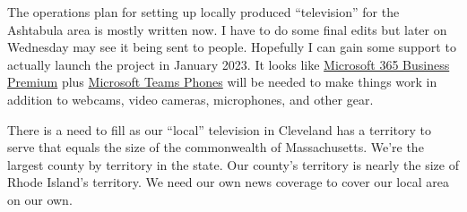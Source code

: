 The operations plan for setting up locally produced ``television'' for
the Ashtabula area is mostly written now. I have to do some final edits
but later on Wednesday may see it being sent to people. Hopefully I can
gain some support to actually launch the project in January 2023. It
looks like
\href{https://www.microsoft.com/en-us/microsoft-365/business/microsoft-365-business-premium?activetab=pivot\%3aoverviewtab}{Microsoft
365 Business Premium} plus
\href{https://www.microsoft.com/en-us/microsoft-teams/microsoft-teams-phone\#office-InlineSkuChooser-b423wnv}{Microsoft
Teams Phones} will be needed to make things work in addition to webcams,
video cameras, microphones, and other gear.

There is a need to fill as our ``local'' television in Cleveland has a
territory to serve that equals the size of the commonwealth of
Massachusetts. We're the largest county by territory in the state. Our
county's territory is nearly the size of Rhode Island's territory. We
need our own news coverage to cover our local area on our own.
